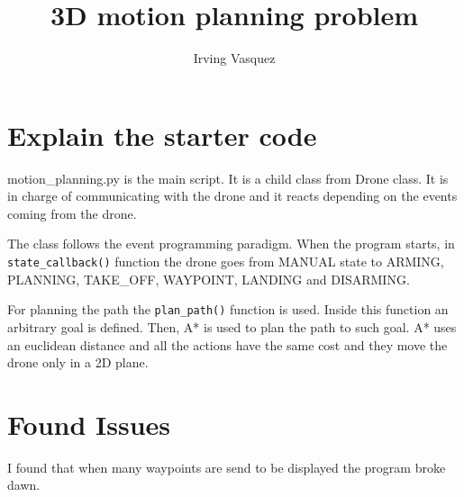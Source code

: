 \documentclass[]{article}
\title{3D motion planning problem}
\author{Irving Vasquez}
\begin{document}
\maketitle

\begin{abstract}

\end{abstract}

\section{Explain the starter code}

motion\_planning.py is the main script. It is a child class from Drone class. It is in charge of communicating with the drone and it reacts depending on the events coming from the drone. 

The class follows the event programming paradigm. When the program starts, in \texttt{state\_callback()} function the drone goes from MANUAL state to ARMING, PLANNING, TAKE\_OFF, WAYPOINT, LANDING and DISARMING.

For planning the path the \texttt{plan\_path()} function is used. Inside this function an arbitrary goal is defined. Then, A* is used to plan the path to such goal. A* uses an euclidean distance and all the actions have the same cost and they move the drone only in a 2D plane.

\section{Found Issues}

I found that when many waypoints are send to be displayed the program broke dawn.
\end{document}
